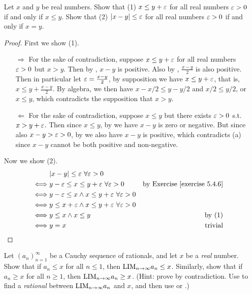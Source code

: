 \begin{exercise} \label{exercise 5.4.7}
Let \(x\) and \(y\) be real numbers.
Show that (1) \(x \le y + \varepsilon\) for all real numbers \(\varepsilon > 0\) if and only if \(x \le y\).
Show that (2) \(\lvert x - y\rvert \le \varepsilon\) for all real numbers \(\varepsilon >  0\) if and only if \(x = y\).
\end{exercise}

\begin{proof}
First we show (1).
\begin{itemize}
    \item[\(\Longrightarrow\)]
        For the sake of contradiction, suppose \(x \le y + \varepsilon\) for all real numbers \(\varepsilon > 0\) but \(x > y\).
        Then by , \(x - y\) is positive.
        Also by , \(\frac{x - y}{2}\) is also positive.
        Then in particular let \(\varepsilon = \frac{x - y}{2}\), by supposition we have \(x \le y + \varepsilon\), that is, \(x \le y + \frac{x - y}{2}\).
        By algebra, we then have \(x - x/2 \le y - y/2\) and \(x/2 \le y/2\), or \(x \le y\), which contradicts the supposition that \(x > y\).
    \item[\(\Longleftarrow\)]
        For the sake of contradiction, suppose \(x \le y\) but there exists \(\varepsilon > 0\) s.t. \(x > y + \varepsilon\).
        Then since \(x \le y\), by  we have \(x - y\) is zero or negative.
        But since also \(x - y > \varepsilon > 0\), by  we also have \(x - y\) is positive, which contradicts (a) since \(x - y\) cannot be both positive and non-negative.
\end{itemize}

Now we show (2).
\begin{align*}
         & \abs{x - y} \le \varE\ \forall \varE > 0 \\
    \iff & y -\varE \le x \le y + \varE\ \forall \varE > 0 &  \text{by \EXEC{5.4.6}} \\
    \iff & y -\varE \le x \land x \le y + \varE\ \forall \varE > 0 \\
    \iff & y \le x + \varE \land x \le y + \varE\ \forall \varE > 0 \\
    \iff & y \le x \land x \le y & \text{by (1)} \\
    \iff & y = x & \text{trivial}
\end{align*}
\end{proof}

\begin{exercise} \label{exercise 5.4.8}
Let \((a_n)_{n = 1}^{\infty}\) be a Cauchy sequence of rationals, and let \(x\) be a \emph{real} number.
Show that if \(a_n \le x\) for all \(n \le 1\), then \(\text{LIM}_{n \to \infty} a_n \le x\).
Similarly, show that if \(a_n \ge x\) for all \(n \ge 1\), then \(\text{LIM}_{n \to \infty} a_n \ge x\).
(Hint: prove by contradiction.
Use  to find a \emph{rational} between \(\text{LIM}_{n \to \infty} a_n\) and \(x\), and then use  or .)
\end{exercise}

